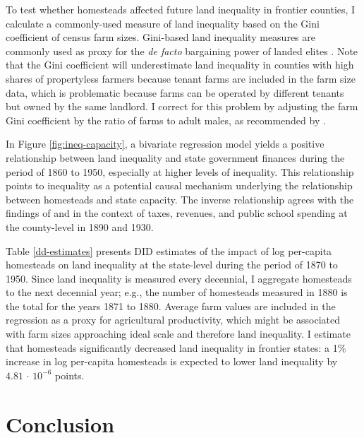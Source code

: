 To test whether homesteads affected future land inequality in frontier counties, I calculate a commonly-used measure of land inequality based on the Gini coefficient of census farm sizes. Gini-based land inequality measures are commonly used as proxy for the \emph{de facto} bargaining power of landed elites \citep[e.g.,][]{boix2003democracy,ziblatt2008does,ansell2015}. Note that the Gini coefficient will underestimate land inequality in counties with high shares of propertyless farmers because tenant farms are included in the farm size data, which is problematic because farms can be operated by different tenants but owned by the same landlord. I correct for this problem by adjusting the farm Gini coefficient by the ratio of farms to adult males, as recommended by \citet{vollrath2013inequality}.

In Figure \ref{fig:ineq-capacity}, a bivariate regression model yields a positive relationship between land inequality and state government finances during the period of 1860 to 1950, especially at higher levels of inequality. This relationship points to inequality as a potential causal mechanism underlying the relationship between homesteads and state capacity. The inverse relationship agrees with the findings of \citet{ramcharan2010inequality} and \citet{vollrath2013inequality} in the context of taxes, revenues, and public school spending at the county-level in 1890 and 1930.

Table \ref{dd-estimates} presents DID estimates of the impact of log per-capita homesteads on land inequality at the state-level during the period of 1870 to 1950. Since land inequality is measured every decennial, I aggregate homesteads to the next decennial year; e.g., the number of homesteads measured in 1880 is the total for the years 1871 to 1880. Average farm values are included in the regression as a proxy for agricultural productivity, which might be associated with farm sizes approaching ideal scale and therefore land inequality. I estimate that homesteads significantly decreased land inequality in frontier states: a 1\% increase in log per-capita homesteads is expected to lower  land inequality by $4.81\,\cdot\,10^{-6}$ points. 

\section{Conclusion} \label{discussion} 

